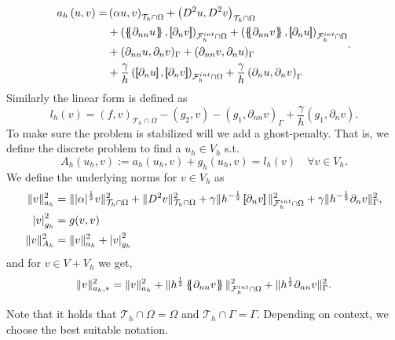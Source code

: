 \begin{equation}
\label{eq:Bi_a_h}
\begin{split}
a_{h} \left( u, v \right)   =&   \left( \alpha  u, v \right) _{\mathcal{T} _{h} \cap \Omega }   +  \left( D^2 u, D^2v \right) _{\mathcal{T} _{h} \cap \Omega} \\
 & +
  \left( \mean{  \partial _{n n} u }, \jump{ \partial _{n }v} \right)_{\mathcal{F}_{h}^{int} \cap \Omega}  +
 \left( \mean{ \partial _{n n} v }, \jump{ \partial _{n}u }      \right)_{\mathcal{F}_{h}^{int} \cap \Omega} \\
 & + ( \partial _{nn} u, \partial _{n} v)_{\Gamma } + ( \partial _{nn} v, \partial _{n} u)_{\Gamma }
 \\
 & + \frac{\gamma }{h}  \left( \jump{ \partial _{n} u}, \jump{ \partial _{n} v_{}   }   \right)_{\mathcal{F}_{h}^{int} \cap \Omega} +  \frac{\gamma }{h}  \left(  \partial _{n} u,  \partial _{n} v_{}      \right)_{\Gamma } \\
\end{split}
.
\end{equation}
Similarly the linear form is defined as
 \[
l_{h}( v) =  ( f,v)_{\mathcal{T} _{h} \cap \Omega } - (g_{2},v) - ( g_{1}, \partial _{nn}v) _{\Gamma } + \frac{\gamma }{h}  ( g_{1}, \partial _{n} v)   .
\]
To make sure the problem is stabilized will we add a ghost-penalty. That is, we define the discrete problem to find a $u_{h} \in V_{h}$ s.t. \[
A_{h}( u_{h} ,v ) := a_{h}( u_{h}, v)  + g_{h}( u_{h},v) = l_{h} ( v) \quad  \forall v \in  V_{h}.
\]
We define the underlying norms for $ v \in V_{h} $ as
    \begin{align}
        \label{eq:bi_ah_norm}
        \| v \|_{ a_{h} }^{ 2 } & =    \| |\alpha |^{\frac{1}{2}}  v \|_{ \mathcal{T} _{h} \cap \Omega  }^{ 2}  + \| D^2 v \|_{\mathcal{T} _{h} \cap \Omega   }^{ 2 } + \gamma \| h^{-\frac{1}{2}} \left[\!\!\left[  \partial _{n} v  \right]\!\!\right]   \|_{ \mathcal{F}_{h}^{int}\cap \Omega    }^{ 2
        } + \gamma \| h^{-\frac{1}{2}}  \partial _{n} v    \|_{ \Gamma   }^{ 2 },    \\
        \label{eq:bi_gh_norm}
\left\lvert  v  \right\rvert _{g_{h}}^{2} & = g( v,v) \\
        \label{eq:bi_Ah_norm}
\| v \|_{A_{h}  }^{  2}  & = \| v \|_{ a_{h} }^{ 2 } + \left\lvert  v  \right\rvert _{g_{h}}^{2}
    \end{align}
and for $v \in V + V_{h}$ we get, \[
\| v \|_{ a_{h}, * }^{  2} =\| v \|_{ a_{h} }^{ 2 } +  \| h^{\frac{1}{2}} \left\{\!\!\left\{ \partial _{nn} v \right\}\!\!\right\}   \|_{\mathcal{F} _{h}^{int} \cap \Omega   }^{  2} +  \| h^{\frac{1}{2}} \partial _{nn} v    \|_{ \Gamma }^{  2} .
\]
\begin{remark}
Note that it holds that $\mathcal{T} _{h} \cap  \Omega   = \Omega  $ and $\mathcal{T} _{h} \cap  \Gamma  = \Gamma $. Depending on context, we choose the best suitable notation.
\end{remark}

